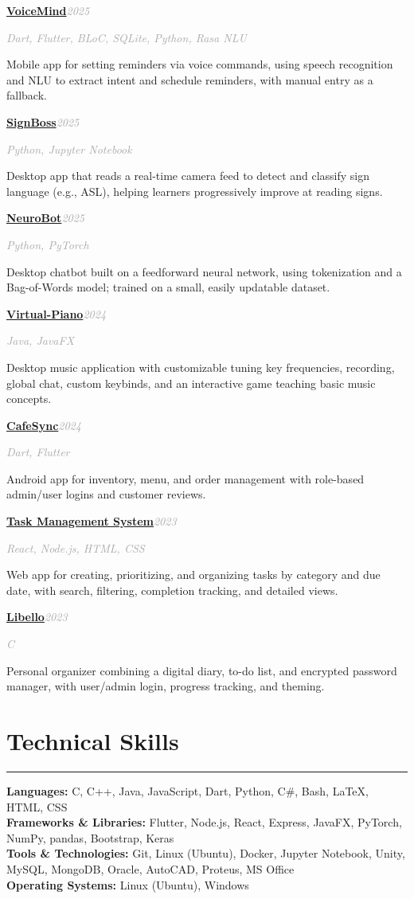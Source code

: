 \documentclass[10pt]{article}
\newcommand{\sectionrule}{\vspace{-2pt}\noindent\textcolor{rulegray}{\rule{\linewidth}{1pt}}\vspace{6pt}}
\newcommand{\cvsection}[1]{%
  \Needspace{6\baselineskip}%
  \section{#1}\sectionrule%
}
\newcommand{\cvitem}[2]{%
  \Needspace{4\baselineskip}%
  \par\vspace{6pt}\noindent\textbf{#1}\hfill\textit{\textcolor{darkgray}{#2}}\par\vspace{1pt}%
}
\newcommand{\cvsub}[1]{\textit{\textcolor{darkgray}{#1}}\par\vspace{2pt}}
\begin{document}
\cvitem{\href{https://github.com/abeshahsan/voice_reminder}{VoiceMind}}{2025}
\cvsub{Dart, Flutter, BLoC, SQLite, Python, Rasa NLU}
Mobile app for setting reminders via voice commands, using speech recognition and NLU to extract intent and schedule reminders, with manual entry as a fallback.

\cvitem{\href{https://github.com/abeshahsan/Sign-Tutor-AI}{SignBoss}}{2025}
\cvsub{Python, Jupyter Notebook}
Desktop app that reads a real-time camera feed to detect and classify sign language (e.g., ASL), helping learners progressively improve at reading signs.

\cvitem{\href{https://github.com/zunaid13/ChatBot}{NeuroBot}}{2025}
\cvsub{Python, PyTorch}
Desktop chatbot built on a feedforward neural network, using tokenization and a Bag-of-Words model; trained on a small, easily updatable dataset.

\cvitem{\href{https://github.com/Inzamam20/TuneCraft}{Virtual-Piano}}{2024}
\cvsub{Java, JavaFX}
Desktop music application with customizable tuning key frequencies, recording, global chat, custom keybinds, and an interactive game teaching basic music concepts.

\cvitem{\href{https://github.com/ZincSulphide/Coffee/tree/master}{CafeSync}}{2024}
\cvsub{Dart, Flutter}
Android app for inventory, menu, and order management with role-based admin/user logins and customer reviews.

\cvitem{\href{https://github.com/zunaid13/Web-Quiz-Task-Management-System}{Task Management System}}{2023}
\cvsub{React, Node.js, HTML, CSS}
Web app for creating, prioritizing, and organizing tasks by category and due date, with search, filtering, completion tracking, and detailed views.

\cvitem{\href{https://github.com/Inzamam20/Libello}{Libello}}{2023}
\cvsub{C}
Personal organizer combining a digital diary, to-do list, and encrypted password manager, with user/admin login, progress tracking, and theming.

\cvsection{Technical Skills}

\textbf{Languages:} C, C++, Java, JavaScript, Dart, Python, C\#, Bash, LaTeX, HTML, CSS\\
\textbf{Frameworks \& Libraries:} Flutter, Node.js, React, Express, JavaFX, PyTorch, NumPy, pandas, Bootstrap, Keras\\
\textbf{Tools \& Technologies:} Git, Linux (Ubuntu), Docker, Jupyter Notebook, Unity, MySQL, MongoDB, Oracle, AutoCAD, Proteus, MS Office\\
\textbf{Operating Systems:} Linux (Ubuntu), Windows
\end{document}
